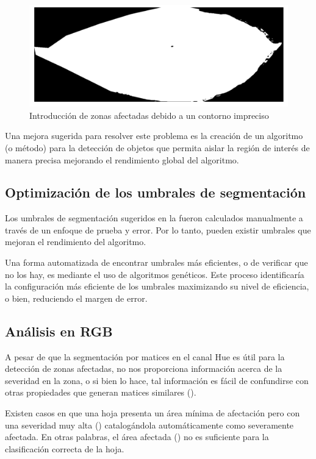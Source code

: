 \begin{figure}[H]
\centering
\includegraphics[scale=1]{images/consideration_contour_binary.png}
\caption{Introducción de zonas afectadas debido a un contorno impreciso}
\label{img:issue_countour_binary}
\end{figure}

Una mejora sugerida para resolver este problema es la creación de un algoritmo (o método) para la detección de objetos que permita aislar la región de interés de manera precisa mejorando el rendimiento global del algoritmo.

\subsection{Optimización de los umbrales de segmentación}

Los umbrales de segmentación sugeridos en la  fueron calculados manualmente a través de un enfoque de prueba y error. Por lo tanto, pueden existir umbrales que mejoran el rendimiento del algoritmo.

Una forma automatizada de encontrar umbrales más eficientes, o de verificar que no los hay, es mediante el uso de algoritmos genéticos. Este proceso identificaría la configuración más eficiente de los umbrales maximizando su nivel de eficiencia, o bien, reduciendo el margen de error.

\subsection{Análisis en RGB}

A pesar de que la segmentación por matices en el canal Hue es útil para la detección de zonas afectadas, no nos proporciona información acerca de la severidad en la zona, o si bien lo hace, tal información es fácil de confundirse con otras propiedades que generan matices similares ().

Existen casos en que una hoja presenta un área mínima de afectación pero con una severidad muy alta () catalogándola automáticamente como severamente afectada. En otras palabras, el área afectada () no es suficiente para la clasificación correcta de la hoja.

